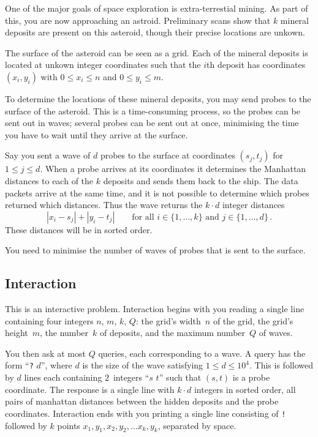 
One of the major goals of space exploration is extra-terrestial mining. 
As part of this, you are now approaching an astroid. 
Preliminary scans show that $k$ mineral deposits are present on this asteroid, though their precise locations are unkown.

\medskip

The surface of the asteroid can be seen as a grid.
Each of the mineral deposits is located at unkown integer coordinates such that the $i$th deposit has coordinates $(x_i,y_i)$ with  $0 \le x_i \le n$ and $0\le y_i \le m$.

To determine the locations of these mineral deposits, you may send probes to the surface of the asteroid. 
This is a time-consuming process, so the probes can be sent out in waves;
several probes can be sent out at once, minimising the time you have to wait until they arrive at the surface.

Say you sent a wave of $d$ probes to the surface at coordinates $(s_j,t_j)$ for $1\leq j\leq d$.
When a probe arrives at its coordinates it determines the Manhattan distances to each of the $k$ deposits and sends them back to the ship. 
The data packets arrive at the same time, and it is not possible to determine which probes returned which distances. 
Thus the wave returns the $k\cdot d$ integer distances
\[|x_i-s_j| + |y_i - t_j| \qquad\text{for all } i \in \{1,\ldots,k\} \text{ and } j \in\{ 1,\ldots,d\}\,.\]
These distances will be in sorted order.

You need to minimise the number of waves of probes that is sent to the surface.

\subsection*{Interaction}

This is an interactive problem.
Interaction begins with you reading a single line containing four integers $n$, $m$, $k$, $Q$:
the grid's width~$n$ of the grid,
the grid's height~$m$, the number~$k$ of deposits, and the maximum number~$Q$ of waves.

You then ask at most $Q$ queries, each corresponding to a wave.
A query has the form ``\texttt{?} $d$'', where $d$ is the size of the wave satisfying
$1\leq d\leq 10^4$. %
This is followed by $d$ lines each containing $2$~integers ``$s$ $t$'' such that $(s,t)$ is a probe coordinate.
The response is a single line with $k \cdot d$ integers in sorted order, all pairs of manhattan distances between the hidden deposits and the probe coordinates.
Interaction ends with you printing a single line consisting of \texttt{!} followed by $k$ points $x_1, y_1, x_2, y_2, \ldots x_k, y_k$, separated by space.

